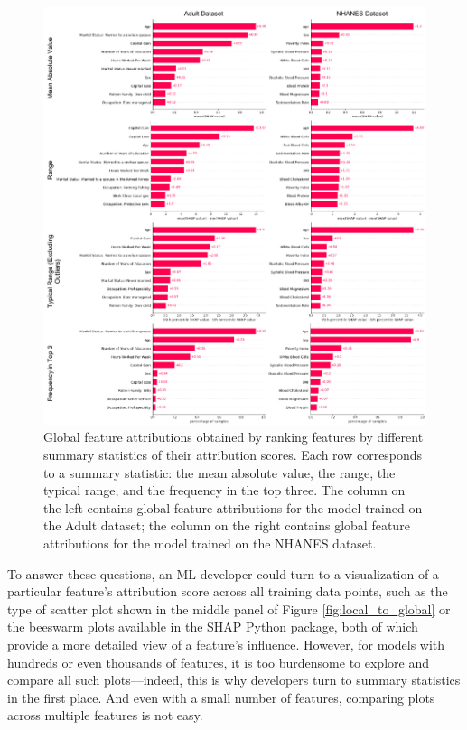 \documentclass[11pt,dvipdfmx]{article}
\begin{document}
\begin{figure}
    \centering
    \includegraphics[width=\linewidth, bb=0 0 475 517]{figs/suite.pdf}
    \caption{Global feature attributions obtained by ranking features
      by different summary statistics of their attribution
      scores. Each row corresponds to a summary statistic: the mean
      absolute value, the range, the typical range, and the frequency
      in the top three.  The column on the left contains global
      feature attributions for the model trained on the Adult dataset;
      the column on the right contains global feature attributions for
      the model trained on the NHANES dataset.}
    \label{fig:suite}
\end{figure}

To answer these questions, an ML developer could turn to a
visualization of a particular feature's attribution score across all
training data points, such as the type of scatter plot shown in the
middle panel of Figure \ref{fig:local_to_global} or the beeswarm plots
available in the SHAP Python package, both of which provide a more
detailed view of a feature's influence. However, for models with
hundreds or even thousands of features, it is too burdensome to
explore and compare all such plots---indeed, this is why developers
turn to summary statistics in the first place.  And even with a small
number of features, comparing plots across multiple features is not
easy.
\end{document}
